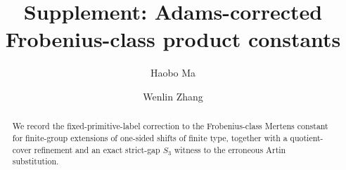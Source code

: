 \documentclass[11pt,a4paper]{amsart}
\title[Supplement: Frobenius-class products]{Supplement: Adams-corrected
Frobenius-class product constants}
\author[Haobo Ma]{Haobo Ma}
\author[Wenlin Zhang]{Wenlin Zhang}
\date{}
\theoremstyle{plain}
\theoremstyle{definition}
\theoremstyle{remark}
\begin{document}
\begin{abstract}
We record the fixed-primitive-label correction to the Frobenius-class Mertens
constant for finite-group extensions of one-sided shifts of finite type,
together with a quotient-cover refinement and an exact strict-gap
\(S_3\) witness to the erroneous Artin substitution.
\end{abstract}
\maketitle








\appendix




\end{document}
